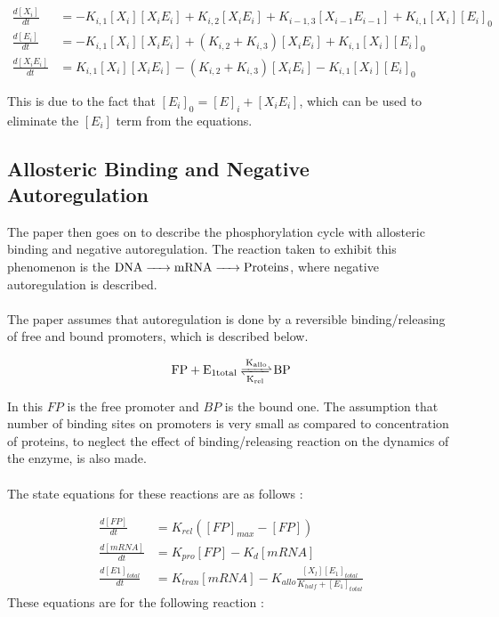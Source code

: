 \begin{align*}
    \frac{d[X_i]}{dt} &= -K_{i,1}[X_i][X_iE_i] + K_{i,2}[X_iE_i] + K_{i-1,3}[X_{i-1}E_{i-1}] + K_{i,1}[X_i][E_i]_0\\
    \frac{d[E_i]}{dt} &= -K_{i,1}[X_i][X_iE_i] + (K_{i,2} + K_{i,3})[X_iE_i] + K_{i,1}[X_i][E_i]_0 \\
    \frac{d[X_iE_i]}{dt} &= K_{i,1}[X_i][X_iE_i] - (K_{i,2} + K_{i,3})[X_iE_i] - K_{i,1}[X_i][E_i]_0
\end{align*}

\noindent This is due to the fact that $[E_i]_0 = [E]_i + 
[X_iE_i]$, which can be used to eliminate the $[E_i]$ term 
from the equations. 

\subsection*{Allosteric Binding and Negative Autoregulation}
The paper then goes on to describe the phosphorylation 
cycle with allosteric binding and negative autoregulation. 
The reaction taken to exhibit this phenomenon is the
$\ce{DNA -> mRNA -> Proteins}$, where negative 
autoregulation is described.
\\\\
The paper assumes that autoregulation is done by a reversible 
binding/releasing of free and bound promoters, which is 
described below.

$$ \ce{FP + E_{1total} <=>[K_{allo}][K_{rel}] BP} $$

\noindent In this $FP$ is the free promoter and $BP$ is the 
bound one. The assumption that number of binding sites on 
promoters is very small as compared to concentration of 
proteins, to neglect the effect of binding/releasing 
reaction on the dynamics of the enzyme, is also made.
\\\\
The state equations for these reactions are as follows :

\begin{align*}
    \frac{d[FP]}{dt} &= K_{rel}([FP]_{max} - [FP])\\
    \frac{d[mRNA]}{dt} &= K_{pro}[FP] - K_d[mRNA]\\
    \frac{d[E1]_{total}}{dt} &= K_{tran}[mRNA] - K_{allo}\frac{[X_l][E_1]_{total}}{K_{half} + [E_1]_{total}}
\end{align*}
\newpage
\noindent These equations are for the following reaction :

